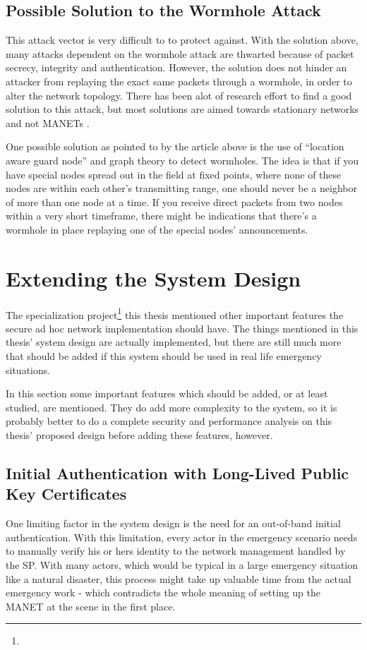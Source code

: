\subsection{Possible Solution to the Wormhole Attack}
This attack vector is very difficult to to protect against. With the solution
above, many attacks dependent on the wormhole attack are thwarted because of
packet secrecy, integrity and authentication. However, the solution does not
hinder an attacker from replaying the exact same packets through a wormhole, in
order to alter the network topology. There has been alot of research effort to
find a good solution to this attack, but most solutions are aimed towards
stationary networks and not \acp{MANET} \cite{raoteapproaches}.

One possible solution as pointed to by the article above is the use of
``location aware guard node'' and graph theory \cite{poovendran2007graph}
\cite{lazos2005preventing} to detect wormholes. The idea is that if you have
special nodes spread out in the field at fixed points, where none of these nodes
are within each other's transmitting range, one should never be a neighbor of
more than one node at a time. If you receive direct packets from two nodes
within a very short timeframe, there might be indications that there's a
wormhole in place replaying one of the special nodes' announcements.

\section{Extending the System Design}
The specialization project\footnote{} this thesis mentioned other important
features the secure ad hoc network implementation should have. The things
mentioned in this thesis' system design are actually implemented, but there are
still much more that should be added if this system should be used in real life
emergency situations.

In this section some important features which should be added, or at least
studied, are mentioned. They do add more complexity to the system, so it is
probably better to do a complete security and performance analysis on this
thesis' proposed design before adding these features, however.

\subsection{Initial Authentication with Long-Lived Public Key Certificates}
One limiting factor in the system design is the need for an out-of-band
initial authentication. With this limitation, every actor in the emergency
scenario needs to manually verify his or hers identity to the network management
handled by the \ac{SP}. With many actors, which would be typical in a large
emergency situation like a natural disaster, this process might take up valuable
time from the actual emergency work - which contradicts the whole meaning of
setting up the \ac{MANET} at the scene in the first place.

